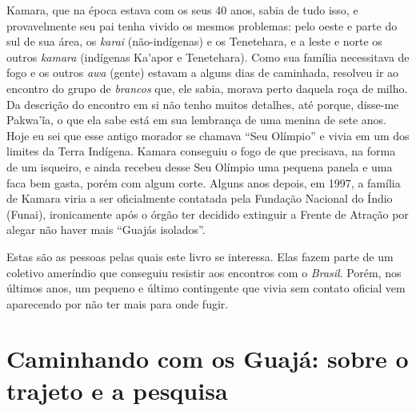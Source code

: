 Kamara, que na época estava com os seus 40 anos, sabia de tudo isso, e
provavelmente seu pai tenha vivido os mesmos problemas: pelo oeste e
parte do sul de sua área, os \emph{karai} (não-indígenas) e os Tenetehara, e a leste e norte os outros \emph{kamara} (indígenas
Ka'apor e Tenetehara). Como sua família necessitava de fogo e os outros
\emph{awa} (gente) estavam a alguns dias de caminhada, resolveu ir ao
encontro do grupo de \emph{brancos} que, ele sabia, morava perto daquela
roça de milho. Da descrição do encontro em si não tenho muitos detalhes,
até porque, disse-me Pakwa'ĩa, o que ela sabe está em sua lembrança de
uma menina de sete anos. Hoje eu sei que esse antigo morador se chamava
``Seu Olímpio'' e vivia em um dos limites da Terra Indígena. Kamara
conseguiu o fogo de que precisava, na forma de um isqueiro, e ainda
recebeu desse Seu Olímpio uma pequena panela e uma faca bem gasta, porém
com algum corte. Alguns anos depois, em 1997, a família de Kamara viria
a ser oficialmente contatada pela Fundação Nacional do Índio (Funai),
ironicamente após o órgão ter decidido extinguir a Frente de Atração por
alegar não haver mais ``Guajás isolados''.

Estas são as pessoas pelas quais este livro se interessa. Elas fazem
parte de um coletivo ameríndio que conseguiu resistir aos encontros com
o \emph{Brasil}. Porém, nos últimos anos, um pequeno e último
contingente que vivia sem contato oficial vem aparecendo por não ter
mais para onde fugir.

\section{Caminhando com os Guajá: sobre o trajeto e a pesquisa}

